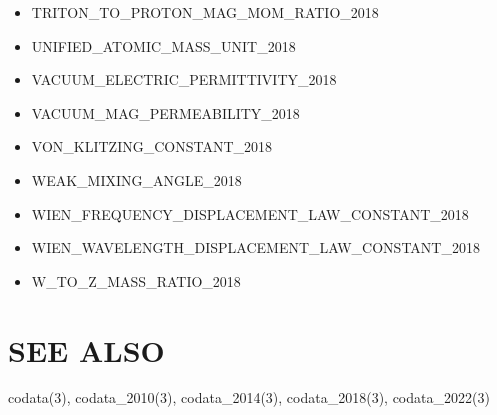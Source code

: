 \begin{itemize}
\item TRITON\_TO\_PROTON\_MAG\_MOM\_RATIO\_2018
\item UNIFIED\_ATOMIC\_MASS\_UNIT\_2018
\item VACUUM\_ELECTRIC\_PERMITTIVITY\_2018
\item VACUUM\_MAG\_PERMEABILITY\_2018
\item VON\_KLITZING\_CONSTANT\_2018
\item WEAK\_MIXING\_ANGLE\_2018
\item WIEN\_FREQUENCY\_DISPLACEMENT\_LAW\_CONSTANT\_2018
\item WIEN\_WAVELENGTH\_DISPLACEMENT\_LAW\_CONSTANT\_2018
\item W\_TO\_Z\_MASS\_RATIO\_2018
\end{itemize}

\section*{SEE ALSO}
codata(3), codata\_2010(3), codata\_2014(3), codata\_2018(3), codata\_2022(3)
